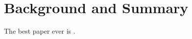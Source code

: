 \section{Background and Summary}
\label{sec:background}


The best paper ever is \citealp{singleton2021geographic}.